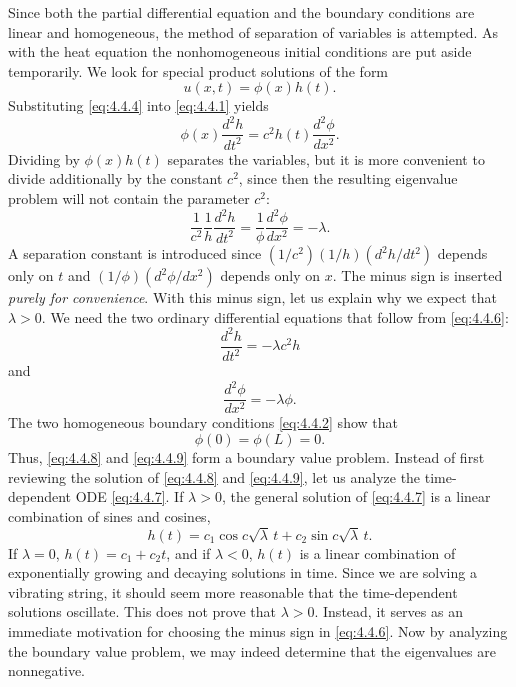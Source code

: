 Since both the partial differential equation and the boundary conditions are linear and homogeneous, the method of separation of variables is attempted.  As with the heat equation the nonhomogeneous initial conditions are put aside temporarily.  We look for special product solutions of the form
\begin{equation}
u(x,t) = \phi(x)h(t).
\label{eq:4.4.4}
\end{equation}
Substituting \eqref{eq:4.4.4} into \eqref{eq:4.4.1} yields
\begin{equation}
\phi(x)\frac{d^2 h}{dt^2} = c^2 h(t)\frac{d^2\phi}{dx^2}.
\label{eq:4.4.5}
\end{equation}
Dividing by $\phi(x)h(t)$ separates the variables, but it is more convenient to divide additionally by the constant $c^2$, since then the resulting eigenvalue problem will not contain the parameter $c^2$:
\begin{equation}
\frac{1}{c^2}\frac{1}{h}\frac{d^2 h}{dt^2} = \frac{1}{\phi}\frac{d^2\phi}{dx^2} = -\lambda.
\label{eq:4.4.6}
\end{equation}
A separation constant is introduced since $(1/c^2)(1/h)(d^2h/dt^2)$ depends only on $t$ and $(1/\phi)(d^2\phi/dx^2)$ depends only on $x$.  The minus sign is inserted \emph{purely for convenience}.  With this minus sign, let us explain why we expect that $\lambda > 0$.  We need the two ordinary differential equations that follow from \eqref{eq:4.4.6}:
\begin{equation}
\frac{d^2 h}{dt^2} = -\lambda c^2 h
\label{eq:4.4.7}
\end{equation}
and
\begin{equation}
\frac{d^2\phi}{dx^2} = -\lambda\phi.
\label{eq:4.4.8}
\end{equation}
The two homogeneous boundary conditions \eqref{eq:4.4.2} show that
\begin{equation}
\phi(0) = \phi(L) = 0.
\label{eq:4.4.9}
\end{equation}
Thus, \eqref{eq:4.4.8} and \eqref{eq:4.4.9} form a boundary value problem.  Instead of first reviewing the solution of \eqref{eq:4.4.8} and \eqref{eq:4.4.9}, let us analyze the time-dependent ODE \eqref{eq:4.4.7}.  If $\lambda > 0$, the general solution of \eqref{eq:4.4.7} is a linear combination of sines and cosines,
\begin{equation}
h(t) = c_1\cos c\sqrt{\lambda}\,t + c_2\sin c\sqrt{\lambda}\,t.
\label{eq:4.4.10}
\end{equation}
If $\lambda = 0$, $h(t) = c_1 + c_2 t$, and if $\lambda < 0$, $h(t)$ is a linear combination of exponentially growing and decaying solutions in time.  Since we are solving a vibrating string, it should seem more reasonable that the time-dependent solutions oscillate.  This does not prove that $\lambda > 0$.  Instead, it serves as an immediate motivation for choosing the minus sign in \eqref{eq:4.4.6}.  Now by analyzing the boundary value problem, we may indeed determine that the eigenvalues are nonnegative.

